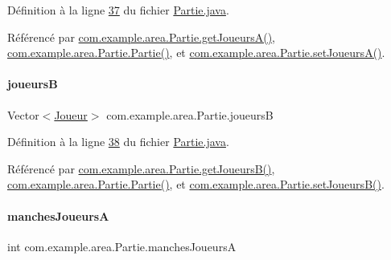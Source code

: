 Définition à la ligne \hyperlink{_partie_8java_source_l00037}{37} du fichier \hyperlink{_partie_8java_source}{Partie.\+java}.



Référencé par \hyperlink{_partie_8java_source_l00064}{com.\+example.\+area.\+Partie.\+get\+Joueurs\+A()}, \hyperlink{_partie_8java_source_l00046}{com.\+example.\+area.\+Partie.\+Partie()}, et \hyperlink{_partie_8java_source_l00359}{com.\+example.\+area.\+Partie.\+set\+Joueurs\+A()}.

\mbox{\label{classcom_1_1example_1_1area_1_1_partie_a208910b83df461c3a2503f3b28650ce8}} 
\paragraph{\texorpdfstring{joueursB}{joueursB}}
{\footnotesize\ttfamily Vector$<$\hyperlink{classcom_1_1example_1_1area_1_1_joueur}{Joueur}$>$ com.\+example.\+area.\+Partie.\+joueursB\hspace{0.3cm}{\ttfamily [private]}}



Définition à la ligne \hyperlink{_partie_8java_source_l00038}{38} du fichier \hyperlink{_partie_8java_source}{Partie.\+java}.



Référencé par \hyperlink{_partie_8java_source_l00072}{com.\+example.\+area.\+Partie.\+get\+Joueurs\+B()}, \hyperlink{_partie_8java_source_l00046}{com.\+example.\+area.\+Partie.\+Partie()}, et \hyperlink{_partie_8java_source_l00367}{com.\+example.\+area.\+Partie.\+set\+Joueurs\+B()}.

\mbox{\label{classcom_1_1example_1_1area_1_1_partie_a4563ef3464c670e68405bb7256abb770}} 
\paragraph{\texorpdfstring{manches\+JoueursA}{manchesJoueursA}}
{\footnotesize\ttfamily int com.\+example.\+area.\+Partie.\+manches\+JoueursA\hspace{0.3cm}{\ttfamily [private]}}



